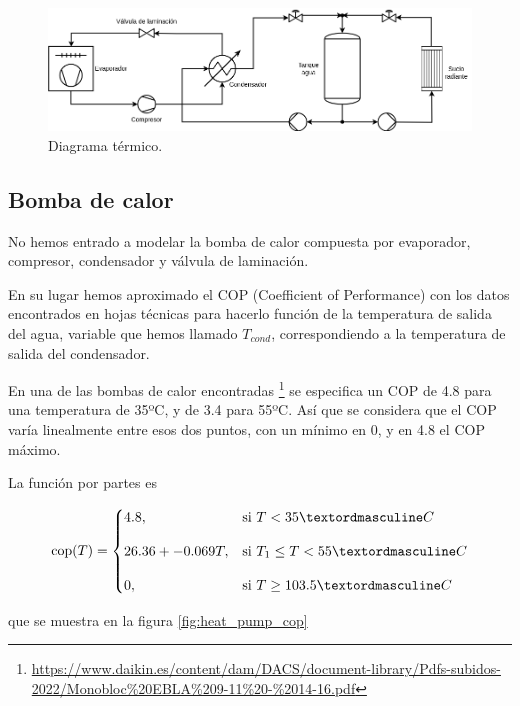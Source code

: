 \begin{figure}[h] \centering
	\centering
	\includegraphics[width=1\textwidth]{./capitulos/resultados_discusion/images/sistema_termico.png}
	\caption{Diagrama térmico.}
	\label{fig:thermal_diagram}
\end{figure}

\subsection{Bomba de calor}

No hemos entrado a modelar la bomba de calor compuesta por evaporador,
compresor, condensador y válvula de laminación.

En su lugar hemos aproximado el COP (Coefficient of Performance) con los datos
encontrados en hojas técnicas para hacerlo función de la temperatura de salida
del agua, variable que hemos llamado $T_{cond}$, correspondiendo a la
temperatura de salida del condensador.

En una de las bombas de calor encontradas
\footnote{\url{https://www.daikin.es/content/dam/DACS/document-library/Pdfs-subidos-2022/Monobloc\%20EBLA\%209-11\%20-\%2014-16.pdf}}
se especifica un COP de 4.8 para una temperatura de 35ºC, y de 3.4 para 55ºC.
Así que se considera que el COP varía linealmente entre esos dos puntos, con un
mínimo en 0, y en 4.8 el COP máximo.

La función por partes es

\begin{equation}
	\text{\text{cop}}(T) =
	\begin{cases}
		4.8,              & \text{si } T < 35ºC          \\[10pt]
		26.36 + -0.069 T, & \text{si } T_1 \leq T < 55ºC \\[10pt]
		0,                & \text{si } T \geq 103.5ºC
	\end{cases}
\end{equation}

que se muestra en la figura \ref{fig:heat_pump_cop}

